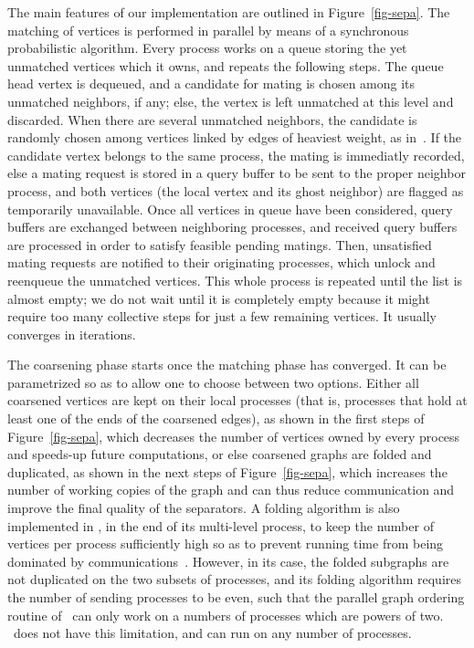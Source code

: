 \documentclass[fleqn,12pt,twoside]{article}
\begin{document}
The main features of our implementation are outlined in
Figure~\ref{fig-sepa}. The matching of vertices is performed in
parallel by means of a synchronous probabilistic algorithm. Every
process works on a queue storing the yet unmatched vertices which it
owns, and repeats the following steps. The queue head vertex is
dequeued, and a candidate for mating is chosen among its unmatched
neighbors, if any; else, the vertex is left unmatched at this level
and discarded. When there are several unmatched neighbors, the
candidate is randomly chosen among vertices linked by edges of
heaviest weight, as in~\cite{kaku95a}. If the candidate vertex belongs
to the same process, the mating is immediatly recorded, else a
mating request is stored in a query buffer to be sent to the proper
neighbor process, and both vertices (the local vertex and its ghost
neighbor) are flagged as temporarily unavailable. Once all vertices in
queue have been considered, query buffers are exchanged between
neighboring processes, and received query buffers are processed in
order to satisfy feasible pending matings. Then, unsatisfied mating
requests are notified to their originating processes, which unlock
and reenqueue the unmatched vertices. This whole process is repeated
until the list is almost empty; we do not wait until it is completely
empty because it might require too many collective steps for just a
few remaining vertices. It usually converges in  iterations.

The coarsening phase starts once the matching phase has converged. It
can be para\-me\-triz\-ed so as to allow one to choose between two
options. Either all coarsened vertices are kept on their local
processes (that is, processes that hold at least one of the ends of
the coarsened edges), as shown in the first steps of
Figure~\ref{fig-sepa}, which decreases the number of vertices owned by
every process and speeds-up future computations, or else coarsened
graphs are folded and duplicated, as shown in the next steps of
Figure~\ref{fig-sepa}, which increases the number of working copies of
the graph and can thus reduce communication and improve the final
quality of the separators. A folding algorithm is also implemented in
\parmetis, in the end of its multi-level process, to keep the number
of vertices per process sufficiently high so as to prevent running
time from being dominated by communications~\cite{kaku97}. However, in
its case, the folded subgraphs are not duplicated on the two subsets
of processes, and its folding algorithm requires the number of
sending processes to be even, such that the parallel graph ordering
routine of \parmetis\ can only work on a numbers of processes which
are powers of two. \ptscotch\ does not have this limitation, and can
run on any number of processes.
\end{document}
